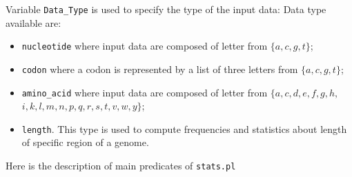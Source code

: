 \documentclass{book}
\begin{document}
Variable \texttt{Data\_Type} is used to specify the type of the input data:
Data type available are:
\begin{itemize}
\item \texttt{nucleotide} where input data are composed of letter from $\{a,c,g,t\}$;
\item \texttt{codon} where a codon is represented by a list of three letters from $\{a,c,g,t\}$;
\item \texttt{amino\_acid} where input data are composed of letter from $\{a,c,d,e,f,g,h,$
$i,k,l,m,n,p,q,r,s,t,v,w,y\}$;
\item \texttt{length}. This type is used to compute frequencies and statistics about length of specific region of a genome. 
\end{itemize} 

Here is the description of main predicates of \texttt{stats.pl}
\end{document}
